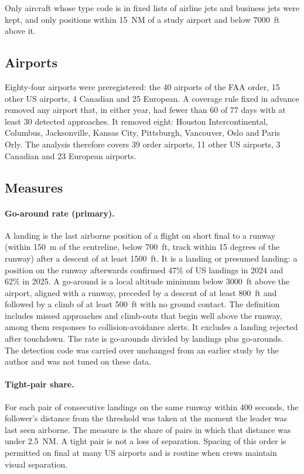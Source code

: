 \documentclass[11pt]{article}
\begin{document}
Only aircraft whose type code is in fixed lists of airline jets and business jets were kept, and only positions within 15~NM of a study airport and below \num{7000}~ft above it.

\subsection{Airports}

Eighty-four airports were preregistered: the 40 airports of the FAA order, 15 other US airports, 4 Canadian and 25 European. A coverage rule fixed in advance removed any airport that, in either year, had fewer than 60 of 77 days with at least 30 detected approaches. It removed eight: Houston Intercontinental, Columbus, Jacksonville, Kansas City, Pittsburgh, Vancouver, Oslo and Paris Orly. The analysis therefore covers 39 order airports, 11 other US airports, 3 Canadian and 23 European airports.

\subsection{Measures}

\paragraph{Go-around rate (primary).} A landing is the last airborne position of a flight on short final to a runway (within 150~m of the centreline, below 700~ft, track within 15 degrees of the runway) after a descent of at least \num{1500}~ft. It is a landing or presumed landing: a position on the runway afterwards confirmed 47\% of US landings in 2024 and 62\% in 2025. A go-around is a local altitude minimum below \num{3000}~ft above the airport, aligned with a runway, preceded by a descent of at least 800~ft and followed by a climb of at least 500~ft with no ground contact. The definition includes missed approaches and climb-outs that begin well above the runway, among them responses to collision-avoidance alerts. It excludes a landing rejected after touchdown. The rate is go-arounds divided by landings plus go-arounds. The detection code was carried over unchanged from an earlier study by the author and was not tuned on these data.

\paragraph{Tight-pair share.} For each pair of consecutive landings on the same runway within 400 seconds, the follower's distance from the threshold was taken at the moment the leader was last seen airborne. The measure is the share of pairs in which that distance was under 2.5~NM. A tight pair is not a loss of separation. Spacing of this order is permitted on final at many US airports and is routine when crews maintain visual separation.
\end{document}
